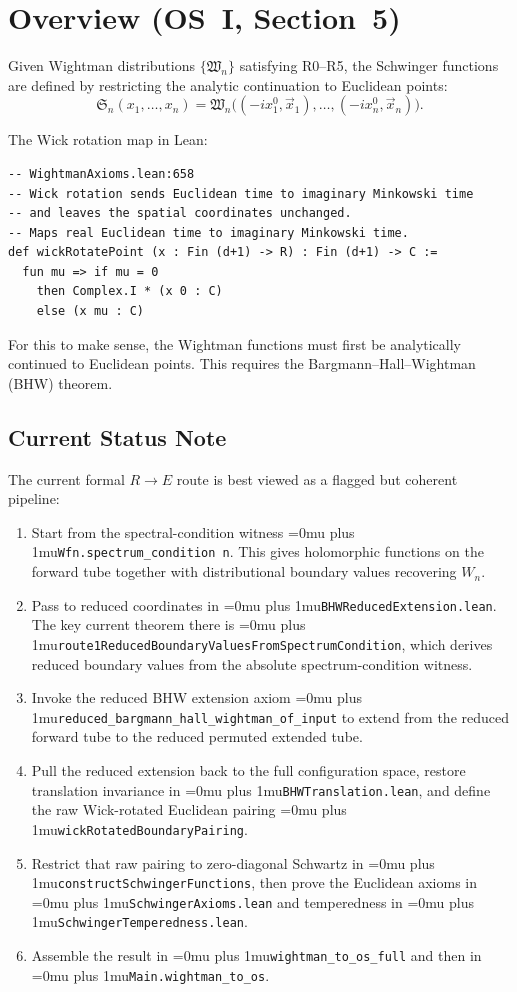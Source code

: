 \documentclass[11pt,a4paper]{article}
\newcommand{\leanfile}[1]{\begingroup\Urlmuskip=0mu plus 1mu\relax\nolinkurl{#1}\endgroup}
\newcommand{\leanname}[1]{\begingroup\Urlmuskip=0mu plus 1mu\relax\nolinkurl{#1}\endgroup}
\begin{document}
\section{Overview (OS~I, Section~5)}

Given Wightman distributions $\{\mathfrak{W}_n\}$ satisfying R0--R5,
the Schwinger functions are defined by restricting the analytic continuation
to Euclidean points:
\[
\mathfrak{S}_n(x_1, \ldots, x_n) =
\mathfrak{W}_n\bigl((-ix_1^0, \vec{x}_1), \ldots, (-ix_n^0, \vec{x}_n)\bigr).
\]

The Wick rotation map in Lean:

\begin{lstlisting}
-- WightmanAxioms.lean:658
-- Wick rotation sends Euclidean time to imaginary Minkowski time
-- and leaves the spatial coordinates unchanged.
-- Maps real Euclidean time to imaginary Minkowski time.
def wickRotatePoint (x : Fin (d+1) -> R) : Fin (d+1) -> C :=
  fun mu => if mu = 0
    then Complex.I * (x 0 : C)
    else (x mu : C)
\end{lstlisting}

For this to make sense, the Wightman functions must first be analytically
continued to Euclidean points. This requires the Bargmann--Hall--Wightman
(BHW) theorem.

\subsection{Current Status Note}

The current formal $R \to E$ route is best viewed as a flagged but coherent
pipeline:
\begin{enumerate}
\item Start from the spectral-condition witness
  \leanname{Wfn.spectrum\_condition n}. This gives holomorphic functions on the
  forward tube together with distributional boundary values recovering $W_n$.
\item Pass to reduced coordinates in
  \leanfile{BHWReducedExtension.lean}. The key current theorem there is
  \leanname{route1ReducedBoundaryValuesFromSpectrumCondition}, which derives
  reduced boundary values from the absolute spectrum-condition witness.
\item Invoke the reduced BHW extension axiom
  \leanname{reduced\_bargmann\_hall\_wightman\_of\_input} to extend from the
  reduced forward tube to the reduced permuted extended tube.
\item Pull the reduced extension back to the full configuration space, restore
  translation invariance in \leanfile{BHWTranslation.lean}, and define the raw
  Wick-rotated Euclidean pairing
  \leanname{wickRotatedBoundaryPairing}.
\item Restrict that raw pairing to zero-diagonal Schwartz in
  \leanname{constructSchwingerFunctions}, then prove the Euclidean axioms in
  \leanfile{SchwingerAxioms.lean} and temperedness in
  \leanfile{SchwingerTemperedness.lean}.
\item Assemble the result in
  \leanname{wightman\_to\_os\_full} and then in
  \leanname{Main.wightman\_to\_os}.
\end{enumerate}
\end{document}
